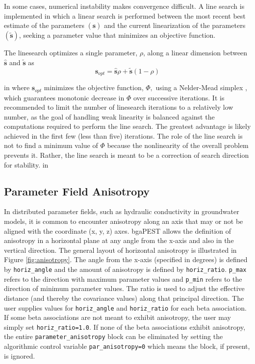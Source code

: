 \documentclass[11pt,oneside,onecolumn]{usgsreport}
\begin{document}
\begin{appendix}
\begin{bibunit}
In some cases, numerical instability makes convergence difficult.
A line search is implemented in which a linear search is performed
between the most recent best estimate of the parameters $\left(\mathbf{\hat{s}}\right)$
and the current linearization of the parameters $\left(\mathbf{\widetilde{\mathbf{s}}}\right)$,
seeking a parameter value that minimizes an objective function. 

The linesearch optimizes a single parameter, $\rho$, along a linear
dimension between $\mathbf{\hat{s}}$ and $\mathbf{\widetilde{\mathbf{s}}}$
as
\[
\mathbf{s}_{opt}=\mathbf{\mathbf{\hat{s}}}\rho+\mathbf{\widetilde{\mathbf{s}}}\left(1-\rho\right)
\]

 in
where $\mathbf{s}_{opt}$ minimizes the objective function, $\Phi,$
using a Nelder-Mead simplex \citep[see, e.g., ][]{Press1992}, which
guarantees monotonic decrease in $\Phi$ over successive
iterations. It is recommended to limit the number of linesearch iterations
to a relatively low number, as the goal of handling weak linearity
is balanced against the computations required to perform the line
search. The greatest advantage is likely achieved in the first few
(less than five) iterations. The role of the line search is not to
find a minimum value of $\Phi$ because the nonlinearity
of the overall problem prevents it. Rather, the line search is meant
to be a correction of search direction for stability.
 in

\subsection{Parameter Field Anisotropy\label{sub:anisotropy}}

In distributed parameter fields, such as hydraulic conductivity in
groundwater models, it is common to encounter anisotropy along an
axis that may or not be aligned with the coordinate (x, y, z) axes.
bgaPEST allows the definition of anisotropy in a horizontal plane
at any angle from the x-axis and also in the vertical direction. The
general layout of horizontal anisotropy is illustrated in Figure \ref{fig:anisotropy}.
The angle from the x-axis (specified in degrees) is defined by \texttt{horiz\_angle}
and the amount of anisotropy is defined by \texttt{horiz\_ratio}.
\texttt{p\_max} refers to the direction with maximum parameter values
and \texttt{p\_min} refers to the direction of minimum parameter
values. The ratio is used to adjust the effective distance (and thereby
the covariance values) along that principal direction. The user supplies
values for \texttt{horiz\_angle} and \texttt{horiz\_ratio} for each
beta association. If some beta associations are not meant to exhibit
anisotropy, the user may simply set \texttt{horiz\_ratio=1.0}. If
none of the beta associations exhibit anisotropy, the entire \texttt{parameter\_anisotropy}
block can be eliminated by setting the algorithmic control variable
\texttt{par\_anisotropy=0} which means the block, if present, is
ignored.


\end{bibunit}
\end{appendix}
\end{document}

